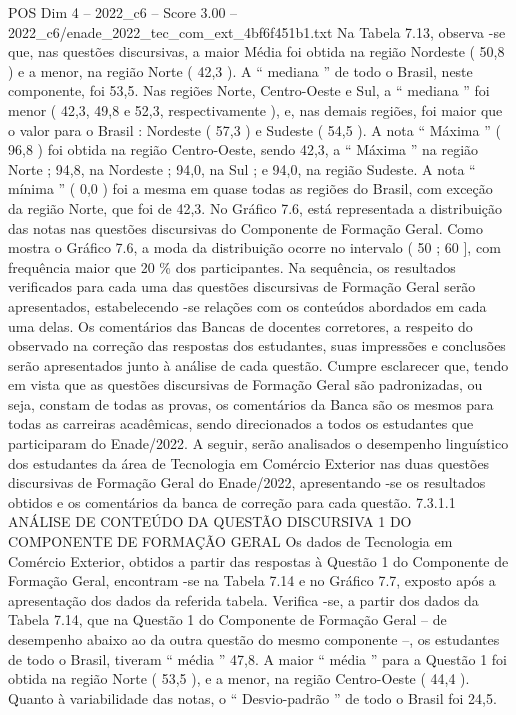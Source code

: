 \begin{textsample}{POS Dim 4 – 2022\_c6 – Score 3.00 – 2022\_c6/enade\_2022\_tec\_com\_ext\_4bf6f451b1.txt}
Na Tabela 7.13, observa -se que, nas questões discursivas, a maior Média foi obtida na região Nordeste ( 50,8 ) e a menor, na região Norte ( 42,3 ).
A “ mediana ” de todo o Brasil, neste componente, foi 53,5.
Nas regiões Norte, Centro-Oeste e Sul, a “ mediana ” foi menor ( 42,3, 49,8 e 52,3, respectivamente ), e, nas demais regiões, foi maior que o valor para o Brasil : Nordeste ( 57,3 ) e Sudeste ( 54,5 ).
A nota “ Máxima ” ( 96,8 ) foi obtida na região Centro-Oeste, sendo 42,3, a “ Máxima ” na região Norte ; 94,8, na Nordeste ; 94,0, na Sul ; e 94,0, na região Sudeste.
A nota “ mínima ” ( 0,0 ) foi a mesma em quase todas as regiões do Brasil, com exceção da região Norte, que foi de 42,3.
No Gráfico 7.6, está representada a distribuição das notas nas questões discursivas do Componente de Formação Geral.
Como mostra o Gráfico 7.6, a moda da distribuição ocorre no intervalo ( 50 ; 60 ], com frequência maior que 20 \% dos participantes.
Na sequência, os resultados verificados para cada uma das questões discursivas de Formação Geral serão apresentados, estabelecendo -se relações com os conteúdos abordados em cada uma delas.
Os comentários das Bancas de docentes corretores, a respeito do observado na correção das respostas dos estudantes, suas impressões e conclusões serão apresentados junto à análise de cada questão.
Cumpre esclarecer que, tendo em vista que as questões discursivas de Formação Geral são padronizadas, ou seja, constam de todas as provas, os comentários da Banca são os mesmos para todas as carreiras acadêmicas, sendo direcionados a todos os estudantes que participaram do Enade/2022.
A seguir, serão analisados o desempenho linguístico dos estudantes da área de Tecnologia em Comércio Exterior nas duas questões discursivas de Formação Geral do Enade/2022, apresentando -se os resultados obtidos e os comentários da banca de correção para cada questão. 7.3.1.1 ANÁLISE DE CONTEÚDO DA QUESTÃO DISCURSIVA 1 DO COMPONENTE DE FORMAÇÃO GERAL Os dados de Tecnologia em Comércio Exterior, obtidos a partir das respostas à Questão 1 do Componente de Formação Geral, encontram -se na Tabela 7.14 e no Gráfico 7.7, exposto após a apresentação dos dados da referida tabela.
Verifica -se, a partir dos dados da Tabela 7.14, que na Questão 1 do Componente de Formação Geral – de desempenho abaixo ao da outra questão do mesmo componente –, os estudantes de todo o Brasil, tiveram “ média ” 47,8.
A maior “ média ” para a Questão 1 foi obtida na região Norte ( 53,5 ), e a menor, na região Centro-Oeste ( 44,4 ).
Quanto à variabilidade das notas, o “ Desvio-padrão ” de todo o Brasil foi 24,5.

\end{textsample}
